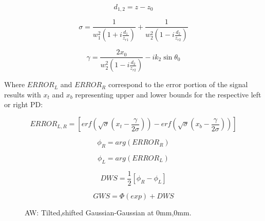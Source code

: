 \documentclass[aps,twoside,secnumarabic,balancelastpage,amsmath,amssymb,nofootinbib,hyperref=pdftex]{revtex4}
\begin{document}
\begin{equation} 
d_{1,2} = z-z_0
\end{equation}

\begin{equation}
    \sigma = \frac{1}{w_1^2(1+i\frac{d_1}{z_{r1}})}
        + \frac{1}{w_2^2(1-i\frac{d_2}{z_{r2}})}
\end{equation}


\begin{equation}
    \gamma = \frac{2 x_0}{w_2^2(1-i \frac{d_2}{z_{r2}})}
        -  ik_2 \sin \theta_0
\end{equation}

Where $ERROR_L$ and $ERROR_R$ correspond to the error portion of the signal results with $x_t$ and $x_b$ representing upper and lower bounds for the respective left or right PD:

\begin{equation}
ERROR_{L,R} = 
    [
    erf(\sqrt{\sigma}(x_t-\frac{\gamma}{2 \sigma}))
    -erf(\sqrt{\sigma}(x_b-\frac{\gamma}{2 \sigma}))
    ]
\end{equation}

\begin{equation}
\phi_R = 
    arg (ERROR_R)
\end{equation}

\begin{equation}
\phi_L = 
    arg (ERROR_L)
\end{equation}

\begin{equation}
 DWS = 
 \frac{1}{2}
[
\phi_R-\phi_L
]
\end{equation}


\begin{equation}
 GWS = \Phi(exp)  + DWS
\end{equation}

\clearpage
	
	\begin{figure}
	\centering
	\caption{AW: Tilted,shifted Gaussian-Gaussian at 0mm,0mm.}
	\label{fig:20}
	\end{figure}
	
\end{document}
